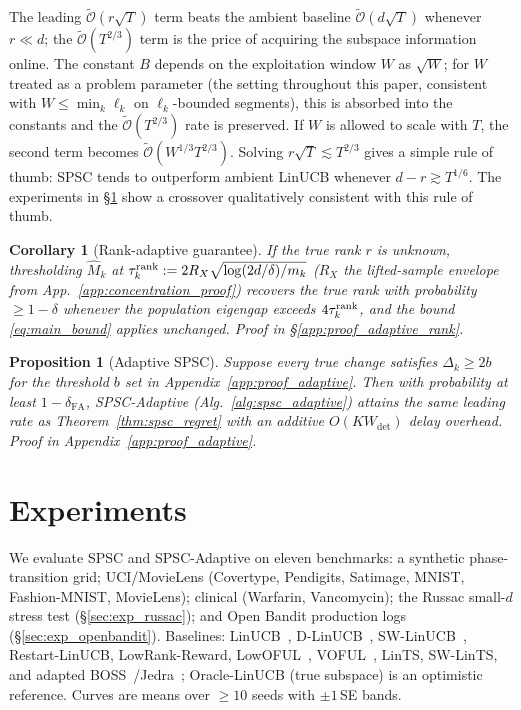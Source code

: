 \documentclass{article}
\newcommand{\tilO}{\widetilde{\mathcal{O}}}
\newtheorem{corollary}[theorem]{Corollary}
\newtheorem{proposition}[theorem]{Proposition}
\begin{document}
The leading $\tilO(r\sqrt{T})$ term beats the ambient baseline
$\tilO(d\sqrt{T})$ whenever $r \ll d$; the $\tilO(T^{2/3})$ term is
the price of acquiring the subspace information online. The constant
$B$ depends on the exploitation window $W$ as $\sqrt W$; for $W$
treated as a problem parameter (the setting throughout this paper,
consistent with $W\le\min_k\ell_k$ on $\ell_k$-bounded segments), this
is absorbed into the constants and the $\tilO(T^{2/3})$ rate is
preserved. If $W$ is allowed to scale with $T$, the second term
becomes $\tilO(W^{1/3}T^{2/3})$. Solving
$r\sqrt{T}\lesssim T^{2/3}$ gives a simple rule of thumb: SPSC tends
to outperform ambient LinUCB whenever $d-r\gtrsim T^{1/6}$. The
experiments in \S\ref{sec:experiments} show a crossover
qualitatively consistent with this rule of thumb.

\begin{corollary}[Rank-adaptive guarantee]
\label{cor:rank_adaptive}
If the true rank $r$ is unknown, thresholding $\widehat M_k$
at $\tau_k^{\rm rank} := 2R_X\sqrt{\log(2d/\delta)/m_k}$
($R_X$ the lifted-sample envelope from
App.~\ref{app:concentration_proof}) recovers the true rank with
probability $\ge 1-\delta$ whenever the population eigengap exceeds
$4\tau_k^{\rm rank}$, and the bound \eqref{eq:main_bound} applies
unchanged. Proof in \S\ref{app:proof_adaptive_rank}.
\end{corollary}

\begin{proposition}[Adaptive SPSC]
  \label{thm:spsc_adaptive}
  Suppose every true change satisfies $\Delta_k\ge 2b$ for the
  threshold $b$ set in Appendix~\ref{app:proof_adaptive}. Then with
  probability at least $1-\delta_{\mathrm{FA}}$, SPSC-Adaptive
  (Alg.~\ref{alg:spsc_adaptive}) attains the same leading rate as
  Theorem~\ref{thm:spsc_regret} with an additive $O(K W_{\mathrm{det}})$
  delay overhead. Proof in Appendix~\ref{app:proof_adaptive}.
  \end{proposition}


\section{Experiments}
\label{sec:experiments}

We evaluate SPSC and SPSC-Adaptive on eleven benchmarks: a synthetic
phase-transition grid; UCI/MovieLens (Covertype, Pendigits, Satimage,
MNIST, Fashion-MNIST, MovieLens); clinical (Warfarin, Vancomycin);
the Russac small-$d$ stress test (\S\ref{sec:exp_russac}); and Open
Bandit production logs (\S\ref{sec:exp_openbandit}). Baselines:
LinUCB~\citep{abbasi2011improved}, D-LinUCB~\citep{russac2019weighted},
SW-LinUCB~\citep{cheung2019learning}, Restart-LinUCB, LowRank-Reward,
LowOFUL~\citep{jun2019bilinear}, VOFUL~\citep{kim2022improved}, LinTS,
SW-LinTS, and adapted BOSS~\citep{duong2024beyond}/Jedra~\citep{jedra2024low};
Oracle-LinUCB (true subspace) is an optimistic reference. Curves are
means over $\ge 10$ seeds with $\pm 1$\,SE bands.
\end{document}
